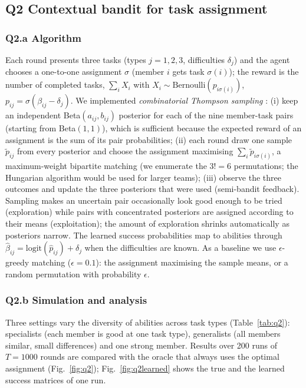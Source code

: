 \documentclass[10pt,a4paper]{article}
\begin{document}
\subsection{Q2 Contextual bandit for task assignment}
\subsubsection{Q2.a Algorithm} Each round presents three tasks (types $j=1,2,3$, difficulties $\delta_j$) and the agent chooses a one-to-one assignment $\sigma$ (member $i$ gets task $\sigma(i)$); the reward is the number of completed tasks, $\sum_i X_i$ with $X_i\sim\text{Bernoulli}(p_{i\sigma(i)})$, $p_{ij}=\sigma(\beta_{ij}-\delta_j)$. We implemented \emph{combinatorial Thompson sampling} \cite{gai2012,wang2018}: (i) keep an independent Beta$(a_{ij},b_{ij})$ posterior for each of the nine member-task pairs (starting from Beta$(1,1)$), which is sufficient because the expected reward of an assignment is the sum of its pair probabilities; (ii) each round draw one sample $\tilde p_{ij}$ from every posterior and choose the assignment maximising $\sum_i\tilde p_{i\sigma(i)}$, a maximum-weight bipartite matching (we enumerate the $3!=6$ permutations; the Hungarian algorithm would be used for larger teams); (iii) observe the three outcomes and update the three posteriors that were used (semi-bandit feedback). Sampling makes an uncertain pair occasionally look good enough to be tried (exploration) while pairs with concentrated posteriors are assigned according to their means (exploitation); the amount of exploration shrinks automatically as posteriors narrow. The learned success probabilities map to abilities through $\hat\beta_{ij}=\text{logit}(\hat p_{ij})+\delta_j$ when the difficulties are known. As a baseline we use $\epsilon$-greedy matching ($\epsilon=0.1$): the assignment maximising the sample means, or a random permutation with probability $\epsilon$.

\subsubsection{Q2.b Simulation and analysis} Three settings vary the diversity of abilities across task types (Table~\ref{tab:q2}): specialists (each member is good at one task type), generalists (all members similar, small differences) and one strong member. Results over 200 runs of $T=1000$ rounds are compared with the oracle that always uses the optimal assignment (Fig.~\ref{fig:q2}); Fig.~\ref{fig:q2learned} shows the true and the learned success matrices of one run.
\end{document}
